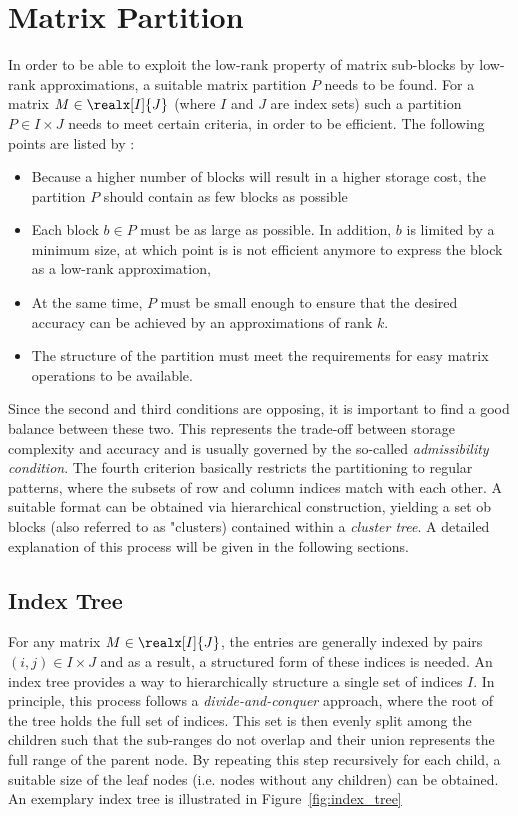 \section{Matrix Partition}
\label{sec:matrix_partition}

In order to be able to exploit the low-rank property of matrix sub-blocks by low-rank approximations, a suitable matrix partition $P$ needs to be found. For a matrix $M \in \realx[I]{J}$ (where $I$ and $J$ are index sets) such a partition $P \in I \times J$ needs to meet certain criteria, in order to be efficient. The following points are listed by \cite{hackbusch_hierarchical_2015}:
\begin{itemize}
    \item Because a higher number of blocks will result in a higher storage cost, the partition $P$ should contain as few blocks as possible
    \item Each block $b \in P$ must be as large as possible. In addition, $b$ is limited by a minimum size, at which point is is not efficient anymore to express the block as a low-rank approximation,
    \item At the same time, $P$ must be small enough  to ensure that the desired accuracy can be achieved by an approximations of rank $k$.
    \item The structure of the partition must meet the requirements for easy matrix operations to be available.
\end{itemize}

\noindent Since the second and third conditions are opposing, it is important to find a good balance between these two. This represents the trade-off between storage complexity and accuracy and is usually governed by the so-called \textit{admissibility condition}. %
The fourth criterion basically restricts the partitioning to regular patterns, where the subsets of row and column indices match with each other. A suitable format can be obtained via hierarchical construction, yielding a set ob blocks (also referred to as "clusters) contained within a \textit{cluster tree}. A detailed explanation of this process will be given in the following sections. 


\subsection{Index Tree}
\label{sec:index_tree}
For any matrix $M \in \realx[I]{J}$, the entries are generally indexed by pairs $(i,j) \in I \times J$ and as a result, a structured form of these indices is needed. An index tree provides a way to hierarchically structure a single set of indices $I$. In principle, this process follows a \textit{divide-and-conquer} approach, where the root of the tree holds the full set of indices. This set is then evenly split among the children such that the sub-ranges do not overlap and their union represents the full range of the parent node. By repeating this step recursively for each child, a suitable size of the leaf nodes (i.e. nodes without any children) can be obtained. An exemplary index tree is illustrated in Figure~\hyperref[fig:index_tree]{\ref{fig:index_tree}}

